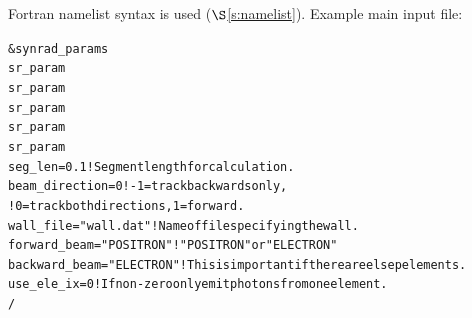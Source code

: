 \documentclass[11pt]{article}
\newcommand{\sref}[1]{$\S$\ref{#1}}
\newenvironment{example}
  {\vspace{-3.0ex} \begin{alltt}}
  {\end{alltt} \vspace{-2.5ex}}
\begin{document}
Fortran namelist syntax is used (\sref{s:namelist}). Example main
input file:
\begin{example}
  &synrad_params
    sr_param%
    sr_param%
    sr_param%
    sr_param%
    sr_param%
    seg_len = 0.1                       ! Segment length for calculation.
    beam_direction = 0                  ! -1 = track backwards only,
                                        !  0 = track both directions, 1 = forward.
    wall_file = "wall.dat"              ! Name of file specifying the wall.
    forward_beam  = "POSITRON"          ! "POSITRON" or "ELECTRON"
    backward_beam = "ELECTRON"          !  This is important if there are elsep elements.
    use_ele_ix = 0                  ! If non-zero only emit photons from one element.
  /
\end{example}
\end{document}
